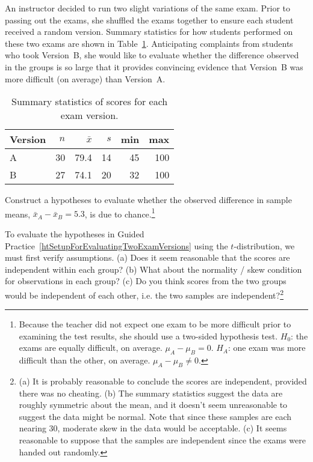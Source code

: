 {

An instructor decided to run two slight variations of the same exam. Prior to passing out the exams, she shuffled the exams together to ensure each student received a random version. Summary statistics for how students performed on these two exams are shown in Table~\ref{summaryStatsForTwoVersionsOfExams}. Anticipating complaints from students who took Version~B, she would like to evaluate whether the difference observed in the groups is so large that it provides convincing evidence that Version~B was more difficult (on average) than Version~A.

\begin{table}[hht]
\centering
\begin{tabular}{l rrrrr}
\hline
Version\hspace{2mm}	& $n$	& $\bar{x}$	& $s$	& min	& max  \\
\hline
A		& 30		& 79.4		& 14 	& 45		& 100 \\
B		& 27		& 74.1		& 20		& 32		& 100 \\
\hline
\end{tabular}
\caption{Summary statistics of scores for each exam version.}
\label{summaryStatsForTwoVersionsOfExams}
\end{table}

\begin{exercise} \label{htSetupForEvaluatingTwoExamVersions}
Construct a hypotheses to evaluate whether the observed difference in sample means, $\bar{x}_A - \bar{x}_B=5.3$, is due to chance.\footnote{Because the teacher did not expect one exam to be more difficult prior to examining the test results, she should use a two-sided hypothesis test. $H_0$: the exams are equally difficult, on average. $\mu_A - \mu_B = 0$. $H_A$: one exam was more difficult than the other, on average. $\mu_A - \mu_B \neq 0$.}
\end{exercise}

\begin{exercise} \label{conditionsForTDistForEvaluatingTwoExamVersions}
To evaluate the hypotheses in Guided Practice~\ref{htSetupForEvaluatingTwoExamVersions} using the $t$-distribution, we must first verify assumptions. (a) Does it seem reasonable that the scores are independent within each group? (b) What about the normality / skew condition for observations in each group? (c) Do you think scores from the two groups would be independent of each other, i.e. the two samples are independent?\footnote{(a) It is probably reasonable to conclude the scores are independent, provided there was no cheating. (b) The summary statistics suggest the data are roughly symmetric about the mean, and it doesn't seem unreasonable to suggest the data might be normal. Note that since these samples are each nearing 30, moderate skew in the data would be acceptable. (c) It seems reasonable to suppose that the samples are independent since the exams were handed out randomly.}
\end{exercise}

}
